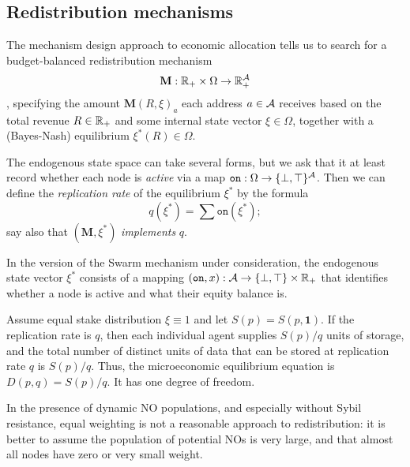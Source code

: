 \subsection{Redistribution mechanisms}

\label{section:redistribution}

The mechanism design approach to economic allocation tells us to search for a budget-balanced redistribution mechanism
\[
  \mathbf{M}:\mathbb{R}_+ \times \Omega \rightarrow \mathbb{R}_+^{\mathcal{A}}
\],
specifying the amount $\mathbf{M}(R,\xi)_a$ each address $a\in\mathcal{A}$ receives based on the total revenue $R\in\mathbb{R}_+$ and some internal state vector $\xi\in\Omega$, together with a (Bayes-Nash) equilibrium $\xi^*(R)\in\Omega$.

The endogenous state space can take several forms, but we ask that it at least record whether each node is \emph{active} via a map $\mathtt{on}:\Omega\rightarrow \{\bot,\top\}^{\mathcal{A}}$.
%
Then we can define the \emph{replication rate} of the equilibrium $\xi^*$ by the formula
\[
  q(\xi^*) = \sum\mathtt{on}(\xi^*);
\]
say also that $(\mathbf{M},\xi^*)$ \emph{implements} $q$.

\begin{example}
  
  In the version of the Swarm mechanism under consideration, the endogenous state vector $\xi^*$ consists of a mapping $(\mathtt{on},x):\mathcal{A}\rightarrow \{\bot,\top\}\times\mathbb{R}_+$ that identifies whether a node is active and what their equity balance is.

\end{example}

\begin{example}

  Assume equal stake distribution $\xi \equiv 1$ and let $S(p)=S(p,\mathbf{1})$.
  If the replication rate is $q$, then each individual agent supplies $S(p)/q$ units of storage, and the total number of distinct units of data that can be stored at replication rate $q$ is $S(p)/q$.
  Thus, the microeconomic equilibrium equation is $D(p,q)=S(p)/q$.
  It has one degree of freedom.

  In the presence of dynamic NO populations, and especially without Sybil resistance, equal weighting is not a reasonable approach to redistribution: it is better to assume the population of potential NOs is very large, and that almost all nodes have zero or very small weight.

\end{example}

